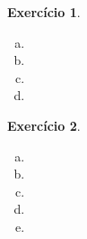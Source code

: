 \documentclass[letter,11pt]{article}
\newtheorem{exer}{Exercício}
\begin{document}
\begin{exer} \rm

\begin{enumerate}[a)]

\item %

\item %

\item %

\item %

\end{enumerate}
\end{exer}


\begin{exer} \rm
  \begin{enumerate}[a)]
    \item %

    \item %

    \item %
  
    \item %

    \item %
\end{enumerate}
\end{exer}
\end{document}

